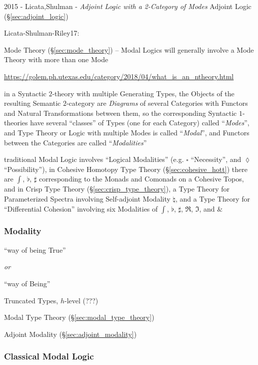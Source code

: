 \asterism

2015 - Licata,Shulman - \emph{Adjoint Logic with a 2-Category of Modes} \fist
Adjoint Logic (\S\ref{sec:adjoint_logic})

Licata-Shulman-Riley17:

\fist Mode Theory (\S\ref{sec:mode_theory}) -- Modal Logics will generally
involve a Mode Theory with more than one Mode

\url{https://golem.ph.utexas.edu/category/2018/04/what_is_an_ntheory.html}

in a Syntactic $2$-theory with multiple Generating Types, the Objects of the
resulting Semantic $2$-category are \emph{Diagrams} of several Categories with
Functors and Natural Transformations between them, so the corresponding
Syntactic $1$-theories have several ``classes'' of Types (one for each
Category) called ``\emph{Modes}'', and Type Theory or Logic with multiple Modes
is called ``\emph{Modal}'', and Functors between the Categories are called
``\emph{Modalities}''

traditional Modal Logic involves ``Logical Modalities'' (e.g. $\square$
``Necessity'', and $\lozenge$ ``Possibility''), in Cohesive Homotopy Type
Theory (\S\ref{sec:cohesive_hott}) there are $\int$, $\flat$, $\sharp$
corresponding to the Monads and Comonads on a Cohesive Topos,
and in Crisp Type Theory (\S\ref{sec:crisp_type_theory}), a Type Theory for
Parameterized Spectra involving Self-adjoint Modality $\natural$, and a Type
Theory for ``Differential Cohesion'' involving six Modalities of $\int$,
$\flat$, $\sharp$, $\mathfrak{R}$, $\mathfrak{I}$, and $\&$



\subsubsection{Modality}\label{sec:modality}

``way of being True''

\emph{or}

``way of Being''

Truncated Types, $h$-level (???) %

Modal Type Theory (\S\ref{sec:modal_type_theory})

Adjoint Modality (\S\ref{sec:adjoint_modality})



\subsubsection{Classical Modal Logic}\label{sec:classical_modal}

